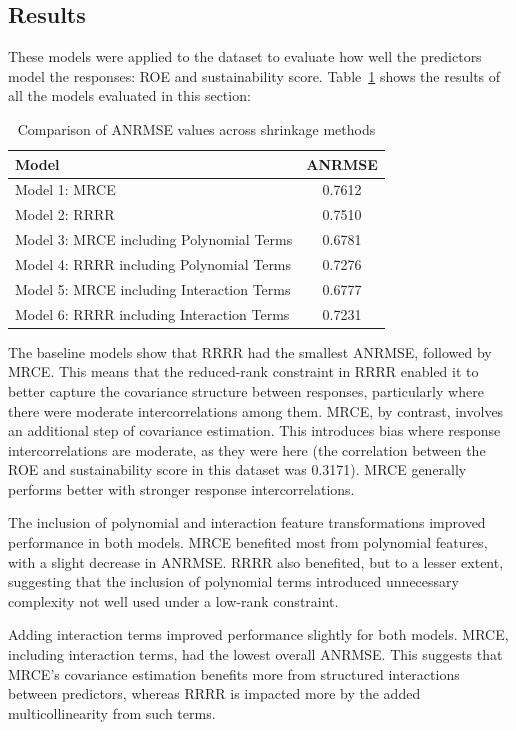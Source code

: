 \documentclass[11pt]{report} %
\begin{document}
\subsection{Results}
These models were applied to the dataset to evaluate how well the predictors model the responses: ROE and sustainability score. 
\noindent Table~\ref{tab:ANRMSE_comparison} shows the results of all the models evaluated in this section: 
\begin{table}[H]
    \centering
    \begin{tabular}{|l|c|}
        \hline
        \textbf{Model} & \textbf{ANRMSE} \\
        \hline
        Model 1: MRCE & 0.7612 \\
        Model 2: RRRR & 0.7510 \\
        Model 3: MRCE including Polynomial Terms & 0.6781 \\
        Model 4: RRRR including Polynomial Terms & 0.7276 \\
        Model 5: MRCE including Interaction Terms & 0.6777 \\
        Model 6: RRRR including Interaction Terms & 0.7231 \\
        \hline
    \end{tabular}
    \caption{Comparison of ANRMSE values across shrinkage methods}
    \label{tab:ANRMSE_comparison}
\end{table}
\noindent The baseline models show that RRRR had the smallest ANRMSE, followed by MRCE. This means that the reduced-rank constraint in RRRR enabled it to better capture the covariance structure between responses, particularly where there were moderate intercorrelations among them. MRCE, by contrast, involves an additional step of covariance estimation. This introduces bias where response intercorrelations are moderate, as they were here (the correlation between the ROE and sustainability score in this dataset was 0.3171). MRCE generally performs better with stronger response intercorrelations.

The inclusion of polynomial and interaction feature transformations improved performance in both models. MRCE benefited most from polynomial features, with a slight decrease in ANRMSE. RRRR also benefited, but to a lesser extent, suggesting that the inclusion of polynomial terms introduced unnecessary complexity not well used under a low-rank constraint.

Adding interaction terms improved performance slightly for both models. MRCE, including interaction terms, had the lowest overall ANRMSE. This suggests that MRCE's covariance estimation benefits more from structured interactions between predictors, whereas RRRR is impacted more by the added multicollinearity from such terms.
\end{document}
